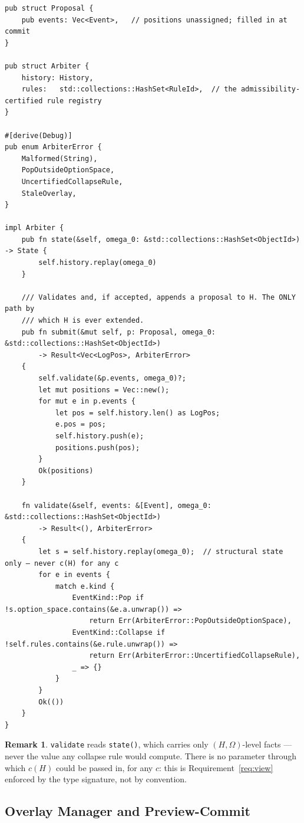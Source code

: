 \documentclass[12pt]{article}
\theoremstyle{definition}
\newtheorem{remark}{Remark}
\newcommand{\Hist}{H}
\begin{document}
\begin{verbatim}
pub struct Proposal {
    pub events: Vec<Event>,   // positions unassigned; filled in at commit
}

pub struct Arbiter {
    history: History,
    rules:   std::collections::HashSet<RuleId>,  // the admissibility-certified rule registry
}

#[derive(Debug)]
pub enum ArbiterError {
    Malformed(String),
    PopOutsideOptionSpace,
    UncertifiedCollapseRule,
    StaleOverlay,
}

impl Arbiter {
    pub fn state(&self, omega_0: &std::collections::HashSet<ObjectId>) -> State {
        self.history.replay(omega_0)
    }

    /// Validates and, if accepted, appends a proposal to H. The ONLY path by
    /// which H is ever extended.
    pub fn submit(&mut self, p: Proposal, omega_0: &std::collections::HashSet<ObjectId>)
        -> Result<Vec<LogPos>, ArbiterError>
    {
        self.validate(&p.events, omega_0)?;
        let mut positions = Vec::new();
        for mut e in p.events {
            let pos = self.history.len() as LogPos;
            e.pos = pos;
            self.history.push(e);
            positions.push(pos);
        }
        Ok(positions)
    }

    fn validate(&self, events: &[Event], omega_0: &std::collections::HashSet<ObjectId>)
        -> Result<(), ArbiterError>
    {
        let s = self.history.replay(omega_0);  // structural state only — never c(H) for any c
        for e in events {
            match e.kind {
                EventKind::Pop if !s.option_space.contains(&e.a.unwrap()) =>
                    return Err(ArbiterError::PopOutsideOptionSpace),
                EventKind::Collapse if !self.rules.contains(&e.rule.unwrap()) =>
                    return Err(ArbiterError::UncertifiedCollapseRule),
                _ => {}
            }
        }
        Ok(())
    }
}
\end{verbatim}

\begin{remark}
\texttt{validate} reads \texttt{state()}, which carries only $(\Hist,\Omega)$-level facts — never the value any collapse rule would compute. There is no parameter through which $c(\Hist)$ could be passed in, for any $c$: this is Requirement~\ref{req:view} enforced by the type signature, not by convention.
\end{remark}

\subsection{Overlay Manager and Preview-Commit}
\end{document}
